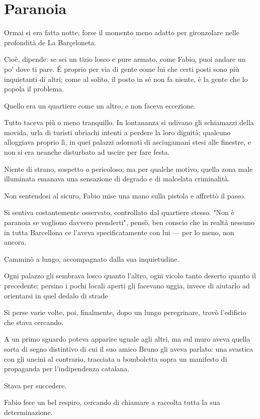 \chapter{Paranoia}

Ormai si era fatta notte, forse il momento meno adatto per gironzolare nelle profondità de La Barçeloneta.

Cioè, dipende: se sei un tizio losco e pure armato, come Fabio, puoi andare un po' dove ti pare. É proprio per via di gente come lui che certi posti sono più inquietanti di altri; come al solito, il posto in sé non fa niente, è la gente che lo popola il problema.

Quello era un quartiere come un altro, e non faceva eccezione.

Tutto taceva più o meno tranquillo. In lontananza si udivano gli schiamazzi della movida, urla di turisti ubriachi intenti a perdere la loro dignità; qualcuno alloggiava proprio lì, in quei palazzi adornati di asciugamani stesi alle finestre, e non si era neanche disturbato ad uscire per fare festa.

Niente di strano, sospetto o pericoloso; ma per qualche motivo, quella zona male illuminata emanava una sensazione di degrado e di malcelata criminalità.

Non sentendosi al sicuro, Fabio mise una mano sulla pistola e affrettò il passo.

Si sentiva costantemente osservato, controllato dal quartiere stesso. "Non è paranoia se vogliono davvero prenderti", pensò, ben conscio che in realtà nessuno in tutta Barcellona ce l'aveva specificatamente con lui --- per lo meno, non ancora.

Camminò a lungo, accompagnato dalla sua inquietudine.

Ogni palazzo gli sembrava losco quanto l'altro, ogni vicolo tanto deserto quanto il precedente; persino i pochi locali aperti gli facevano uggia, invece di aiutarlo ad orientarsi in quel dedalo di strade

Si perse varie volte, poi, finalmente, dopo un lungo peregrinare, trovò l'edificio che stava cercando.

A un primo sguardo poteva apparire uguale agli altri, ma sul muro aveva quella sorta di segno distintivo di cui il suo amico Bruno gli aveva parlato: una svastica con gli uncini al contrario, tracciata a bomboletta sopra un manifesto di propaganda per l'indipendenza catalana.

Stava per succedere.

Fabio fece un bel respiro, cercando di chiamare a raccolta tutta la sua determinazione.

